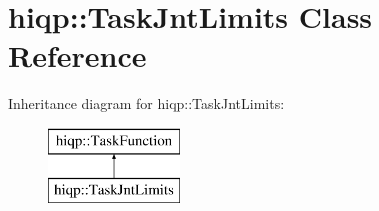 \hypertarget{classhiqp_1_1TaskJntLimits}{\section{hiqp\-:\-:Task\-Jnt\-Limits Class Reference}
\label{classhiqp_1_1TaskJntLimits}
}
Inheritance diagram for hiqp\-:\-:Task\-Jnt\-Limits\-:\begin{figure}[H]
\begin{center}
\leavevmode
\includegraphics[height=2.000000cm]{classhiqp_1_1TaskJntLimits}
\end{center}
\end{figure}
